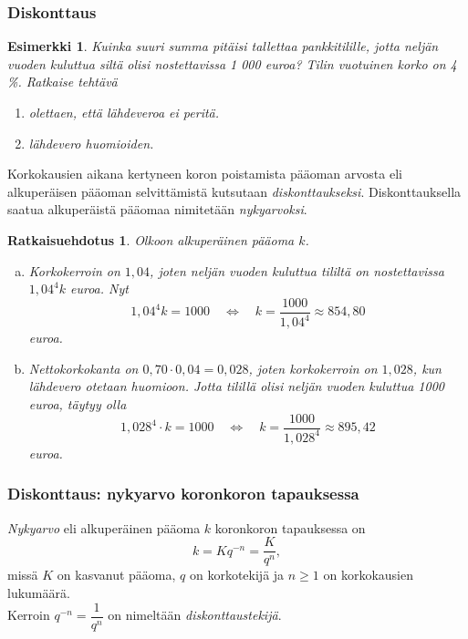 \documentclass[]{beamer}\usepackage[]{graphicx}\usepackage[]{color}
\newtheorem{esim}{Esimerkki}
\newtheorem{ratkaisu}{Ratkaisuehdotus}
\newcommand{\pblock}{\\ \vspace{0.5cm}\pause}
\begin{document}
\begin{frame}
    \frametitle{Diskonttaus}
    \pause
    \begin{esim}
        Kuinka suuri summa pitäisi tallettaa pankkitilille, jotta neljän vuoden kuluttua siltä olisi nostettavissa 1 000 euroa? 
        Tilin vuotuinen korko on 4 \%. Ratkaise tehtävä
        \begin{enumerate}
            \item[(a)] olettaen, että lähdeveroa ei peritä.
            \item[(b)] lähdevero huomioiden.
        \end{enumerate}
    \end{esim}
    \pause
    Korkokausien aikana kertyneen koron poistamista pääoman arvosta eli alkuperäisen pääoman selvittämistä kutsutaan 
    \emph{diskonttaukseksi}.
    \pause
    Diskonttauksella saatua alkuperäistä pääomaa nimitetään \emph{nykyarvoksi}.
\end{frame}

\begin{frame}
    \begin{ratkaisu}
        Olkoon alkuperäinen pääoma \(k\).
        \begin{enumerate}[(a)]
            \item Korkokerroin on \(1,04\), joten neljän vuoden kuluttua tililtä on nostettavissa \(1,04^4k\) euroa. 
            \pause
                Nyt
                \[
                    1,04^4k = 1000\quad\Leftrightarrow\quad k = \frac{1000}{1,04^4}\approx 854,80
                \]
                euroa.
            \item Nettokorkokanta on \(0,70\cdot0,04=0,028\), joten korkokerroin on \(1,028\), kun lähdevero otetaan huomioon. \pause
                Jotta tilillä olisi neljän vuoden kuluttua 1000 euroa, täytyy olla
                \[
                    1,028^4\cdot k = 1000\quad\Leftrightarrow\quad k = \frac{1000}{1,028^4}\approx 895,42
                \]
                euroa.
        \end{enumerate}
    \end{ratkaisu}
\end{frame}

\begin{frame}
    \frametitle{Diskonttaus: nykyarvo koronkoron tapauksessa}
    \pause
    \begin{block}{}
        \emph{Nykyarvo} eli alkuperäinen pääoma $k$ koronkoron tapauksessa on
        \[
            k = Kq^{-n} = \frac{K}{q^n},
        \]
        missä $K$ on kasvanut pääoma, $q$ on korkotekijä ja $n \geq 1$ on korkokausien lukumäärä.
        \pblock
        Kerroin $q^{-n} = \dfrac{1}{q^n}$ on nimeltään \emph{diskonttaustekijä}.
    \end{block}
\end{frame}
\end{document}
